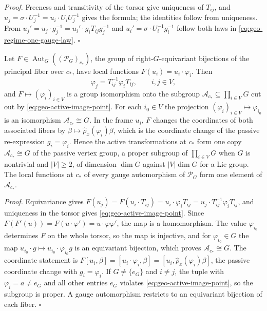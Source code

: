 \noindent\emph{Proof.}
Freeness and transitivity of the torsor give uniqueness of $T_{ij}$, and
$u_j=\sigma\cdot U_j^{-1}=u_i\cdot U_iU_j^{-1}$ gives the formula; the identities follow from
uniqueness. From $u_j'=u_j\cdot g_j^{-1}=u_i'\cdot g_iT_{ij}g_j^{-1}$ and
$u_i'=\sigma\cdot U_i^{-1}g_i^{-1}$ follow both laws in \eqref{eq:geo-regime-one-gauge-law}.
\hfill$\square$

Let $F\in\operatorname{Aut}_G((\mathscr P_G)_{c_*})$, the group of right-$G$-equivariant bijections of
the principal fiber over $c_*$, have local functions $F(u_i)=u_i\cdot\varphi_i$. Then
\begin{equation}
\varphi_j=T_{ij}^{-1}\varphi_iT_{ij},
\qquad i,j\in V,
\label{eq:geo-active-image-point}
\end{equation}
and $F\mapsto(\varphi_i)_{i\in V}$ is a group isomorphism onto the subgroup
$\mathcal A_{c_*}\subseteq\prod_{i\in V}G$ cut out by \eqref{eq:geo-active-image-point}. For each
$i_0\in V$ the projection $(\varphi_i)_{i\in V}\mapsto\varphi_{i_0}$ is an isomorphism
$\mathcal A_{c_*}\cong G$. In the frame $u_i$, $F$ changes the coordinates of both associated
fibers by $\beta\mapsto\widehat\rho_x(\varphi_i)\beta$, which is the coordinate change of the
passive re-expression $g_i=\varphi_i$. Hence the active transformations at $c_*$ form one copy
$\mathcal A_{c_*}\cong G$ of the passive vertex group, a proper subgroup of $\prod_{i\in V}G$ when
$G$ is nontrivial and $|V|\geq2$, of dimension $\dim G$ against $|V|\dim G$ for a Lie group. The
local functions at $c_*$ of every gauge automorphism of $\mathscr P_G$ form one element of
$\mathcal A_{c_*}$. 

\noindent\emph{Proof.}
Equivariance gives $F(u_j)=F(u_i\cdot T_{ij})=u_i\cdot\varphi_iT_{ij}=u_j\cdot T_{ij}^{-1}\varphi_iT_{ij}$,
and uniqueness in the torsor gives \eqref{eq:geo-active-image-point}. Since
$F(F'(u))=F(u\cdot\varphi')=u\cdot\varphi\varphi'$, the map is a homomorphism. The value
$\varphi_{i_0}$ determines $F$ on the whole torsor, so the map is injective, and for
$\varphi_{i_0}\in G$ the map $u_{i_0}\cdot g\mapsto u_{i_0}\cdot\varphi_{i_0}g$ is an equivariant
bijection, which proves $\mathcal A_{c_*}\cong G$. The coordinate statement is
$F[u_i,\beta]=[u_i\cdot\varphi_i,\beta]=[u_i,\widehat\rho_x(\varphi_i)\beta]$, the passive coordinate
change with $g_i=\varphi_i$. If $G\neq\{e_G\}$ and $i\neq j$, the tuple with $\varphi_i=a\neq e_G$ and
all other entries $e_G$ violates \eqref{eq:geo-active-image-point}, so the subgroup is proper. A gauge
automorphism restricts to an equivariant bijection of each fiber. \hfill$\square$

